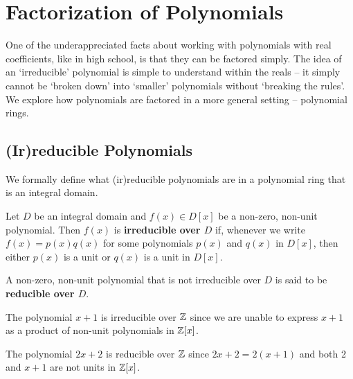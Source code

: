 \chapter{Factorization of Polynomials}
One of the underappreciated facts about working with polynomials with real coefficients, like in high school, is that they can be factored simply. The idea of an `irreducible' polynomial is simple to understand within the reals -- it simply cannot be `broken down' into `smaller' polynomials without `breaking the rules'. We explore how polynomials are factored in a more general setting -- polynomial rings.

\section{(Ir)reducible Polynomials}
We formally define what (ir)reducible polynomials are in a polynomial ring that is an integral domain.
\begin{definition}
    Let $D$ be an integral domain and $f(x) \in D[x]$ be a non-zero, non-unit polynomial. Then $f(x)$ is \textbf{irreducible over $D$} if, whenever we write $f(x) = p(x)q(x)$ for some polynomials $p(x)$ and $q(x)$ in $D[x]$, then either $p(x)$ is a unit or $q(x)$ is a unit in $D[x]$.

    A non-zero, non-unit polynomial that is not irreducible over $D$ is said to be \textbf{reducible over $D$}.
\end{definition}

\begin{example}
    The polynomial $x + 1$ is irreducible over $\mathbb{Z}$ since we are unable to express $x+1$ as a product of non-unit polynomials in $\mathbb{Z}[x]$.
\end{example}

\begin{example}
    The polynomial $2x + 2$ is reducible over $\mathbb{Z}$ since $2x+2 = 2(x+1)$ and both 2 and $x+1$ are not units in $\mathbb{Z}[x]$.
\end{example}

